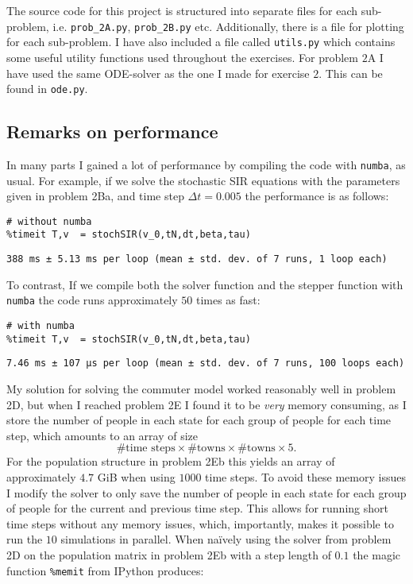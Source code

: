 The source code for this project is structured into separate files for each sub-problem, i.e. \lstinline|prob_2A.py|, \lstinline|prob_2B.py| etc. Additionally, there is a file for plotting for each sub-problem. I have also included a file called \lstinline|utils.py| which contains some useful utility functions used throughout the exercises. For problem $2$A I have used the same ODE-solver as the one I made for exercise $2$. This can be found in \lstinline|ode.py|.
\subsection{Remarks on performance}
In many parts I gained a lot of performance by compiling the code with \lstinline|numba|, as usual. For example, if we solve the stochastic SIR equations with the parameters given in problem 2Ba, and time step $\Delta t = 0.005$ the performance is as follows:
\begin{lstlisting}
# without numba
%timeit T,v  = stochSIR(v_0,tN,dt,beta,tau)
\end{lstlisting}
\texttt{\small388 ms ± 5.13 ms per loop (mean ± std. dev. of 7 runs, 1 loop each)}

To contrast, If we compile both the solver function and the stepper function with \lstinline|numba| the code runs approximately $50$ times as fast:
\begin{lstlisting}
# with numba
%timeit T,v  = stochSIR(v_0,tN,dt,beta,tau)
\end{lstlisting}
\texttt{\small7.46 ms ± 107 µs per loop (mean ± std. dev. of 7 runs, 100 loops each)
}

My solution for solving the commuter model worked reasonably well in problem 2D, but when I reached problem 2E I found it to be \textit{very} memory consuming, as I store the number of people in each state for each group of people for each time step, which amounts to an array of size
$$
	\#\text{time steps}\times\#\text{towns} \times\#\text{towns} \times 5.
$$ 
For the population structure in problem 2Eb this yields an array of approximately $4.7$ GiB when using $1000$ time steps. To avoid these memory issues I modify the solver to only save the number of people in each state for each group of people for the current and previous time step. This allows for running short time steps without any memory issues, which, importantly,  makes it possible to run the $10$ simulations in parallel. When naïvely using the solver from problem 2D on the population matrix in problem 2Eb with a step length of $0.1$ the magic function \lstinline|%memit| from IPython produces:

